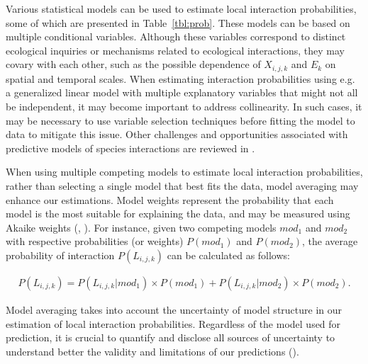 Various statistical models can be used to estimate local interaction
probabilities, some of which are presented in Table~\ref{tbl:prob}. These models can be
based on multiple conditional variables. Although these variables correspond to
distinct ecological inquiries or mechanisms related to ecological interactions,
they may covary with each other, such as the possible dependence of $X_{i,j,k}$
and $E_k$ on spatial and temporal scales. When estimating interaction
probabilities using e.g. a generalized linear model with multiple explanatory
variables that might not all be independent, it may become important to address
collinearity. In such cases, it may be necessary to use variable selection
techniques before fitting the model to data to mitigate this issue. Other
challenges and opportunities associated with predictive models of species
interactions are reviewed in \textcite{Strydom2021Roadmapa}.

When using multiple competing models to estimate local interaction
probabilities, rather than selecting a single model that best fits the data,
model averaging may enhance our estimations. Model weights represent the
probability that each model is the most suitable for explaining the data, and
may be measured using Akaike weights (\cite{Burnham2004Multimodel},
\cite{Wagenmakers2004Aic}). For instance, given two competing models $mod_1$ and
$mod_2$ with respective probabilities (or weights) $P(mod_1)$ and $P(mod_2)$,
the average probability of interaction $P(L_{i, j, k})$ can be calculated as
follows: 

\begin{eqnarray}
  \label{eq:model_ens}
  P(L_{i, j, k}) = P(L_{i, j, k}|mod_1) \times P(mod_1)+ P(L_{i, j, k}|mod_2)
\times P(mod_2).
\end{eqnarray}

Model averaging takes into account the uncertainty of model structure in our
estimation of local interaction probabilities. Regardless of the model used for
prediction, it is crucial to quantify and disclose all sources of uncertainty to
understand better the validity and limitations of our predictions
(\cite{Simmonds2024Recommendations}).



